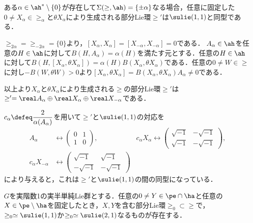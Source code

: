 \begin{lem}\label{lem:su11}
  
  ある$\alpha\in \ah^{*}\setminus\{0\} $が存在して$\Sigma(\ge,\ah) = \{\pm\alpha\}$なる場合，任意に固定した$0\neq X_{\alpha}\in \ge_{\alpha}$と$\theta X_{\alpha}$により生成される部分Lie環$\ge'$は$\sulie(1,1)$と同型である．
\end{lem}

\begin{npfwn}
  $\ge_{2\alpha} = \ge_{-2\alpha} = \{0\}  $より，$[X_{\alpha}, X_{\alpha}] = [X_{-\alpha}, X_{-\alpha}] = 0 $である． $A_{\alpha}\in \ah $を任意の$H\in \ah$に対して$B(H,A_{\alpha}) = \alpha(H) $を満たす元とする．任意の$H\in \ah$に対して$B(H, [X_{\alpha}, \theta X_{\alpha}]) = \alpha(H) B(X_{\alpha}, \theta X_{\alpha}) $である．任意の$0\neq W\in \ge$に対し$-B(W,\theta W) > 0 $より$[X_{\alpha}, \theta X_{\alpha}] = B(X_{\alpha}, \theta X_{\alpha})A_{\alpha}\neq 0 $である．

  以上より$X_{\alpha} $と$\theta X_{\alpha} $により生成される$\ge$の部分Lie環$\ge'$は$\ge' = \real A_{\alpha}\oplus \real X_{\alpha} \oplus \real X_{-\alpha}  $である．

  $c_{\alpha}\defeq \dfrac{2}{\alpha(A_{\alpha})} $を用いて$\ge'$と$\sulie(1,1)$の対応を
  \begin{align*}
    A_{\alpha} &\leftrightarrow
    \begin{pmatrix}
      0 & 1 \\ 1 & 0
    \end{pmatrix},&  c_{\alpha} X_{\alpha} \leftrightarrow
      \begin{pmatrix}
        \sqrt{-1} & -\sqrt{-1} \\ \sqrt{-1} & -\sqrt{-1}
      \end{pmatrix},\\
    c_{\alpha}X_{-\alpha} &\leftrightarrow
      \begin{pmatrix}
        \sqrt{-1} & \sqrt{-1} \\ -\sqrt{-1} & -\sqrt{-1}
      \end{pmatrix} 
  \end{align*}
  により与えると，これは$\ge'$と$\sulie(1,1)$の間の同型になっている．
\end{npfwn}

\begin{cor}\label{cor:sub-lie-alg}
  $G$を実階数1の実半単純Lie群とする．任意の$0\neq Y\in \pe\cap\ha$と任意の$X\in \pe\setminus \ha$を固定したとき，$X,Y$を含む部分Lie環$\ge_0\subset \ge$で，$\ge_0\simeq \sulie(1,1) $か$\ge_0\simeq \sulie(2,1)$なるものが存在する．
\end{cor}

